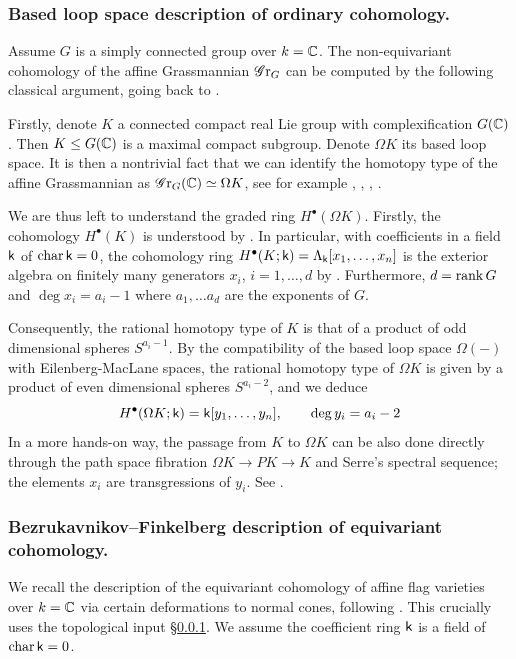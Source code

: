 \subsubsection{Based loop space description of ordinary cohomology.}\label{section: based loop space description}
Assume $G$ is a simply connected group over $k =\operatorname{\mathbb{C}}$. The non-equivariant cohomology of the affine Grassmannian $\operatorname{\mathscr{G}r}_G$ can be computed by the following classical argument, going back to \cite[\S 1.7]{Gin95}. 

Firstly, denote $K$ a connected compact real Lie group with complexification $G(\operatorname{\mathbb{C}})$. Then $K \leq G(\operatorname{\mathbb{C}})$ is a maximal compact subgroup. Denote $\Omega K$ its based loop space. It is then a nontrivial fact that we can identify the homotopy type of the affine Grassmannian as $\operatorname{\mathscr{G}r}_G(\operatorname{\mathbb{C}}) \simeq \Omega K$, see for example \cite[Introduction]{YZ09}, \cite[\S 1.2]{Gin95}, \cite[Remark 5.1]{HHH05}, \cite[\S 1.6]{Zhu15}.

We are thus left to understand the graded ring $H^{\bullet}(\Omega K)$. Firstly, the cohomology $H^{\bullet}(K)$ is understood by \cite{Bor53}. In particular, with coefficients in a field $\mathsf{k}$ of $\operatorname{char} \mathsf{k} = 0$, the cohomology ring $H^{\bullet}(K; \mathsf{k}) = \Lambda_{\mathsf{k}}[x_1, \dots, x_n]$ is the exterior algebra on finitely many generators $x_i$, $i=1, \dots, d$ by \cite[Proposition 7.2]{Bor53}. Furthermore, $d = \operatorname{rank} G$ and $\deg x_i = a_i -1$ where $a_1, \dots a_d$ are the exponents of $G$.

Consequently, the rational homotopy type of $K$ is that of a product of odd dimensional spheres $S^{a_i-1}$. By the compatibility of the based loop space $\Omega(-)$ with Eilenberg-MacLane spaces, the rational homotopy type of $\Omega K$ is given by a product of even dimensional spheres $S^{a_i - 2}$, and we deduce
\begin{equation}\label{equation: cohomology of loop groups}
    H^{\bullet}(\Omega K; \mathsf{k}) = \mathsf{k}[y_1, \dots, y_n], \qquad \deg y_i = a_i - 2
\end{equation}
In a more hands-on way, the passage from $K$ to $\Omega K$ can be also done directly through the path space fibration $\Omega K \to P K \to K$ and Serre's spectral sequence; the elements $x_i$ are transgressions of $y_i$. See \cite[Example 1.16]{Hat04}. 




\subsubsection{Bezrukavnikov--Finkelberg description of equivariant cohomology.}
We recall the description of the equivariant cohomology of affine flag varieties over $k=\operatorname{\mathbb{C}}$ via certain deformations to normal cones, following \cite{BF07, Yun10}. This crucially uses the topological input \S \ref{section: based loop space description}. We assume the coefficient ring $\mathsf{k}$ is a field of $\operatorname{char} \mathsf{k} = 0$.

